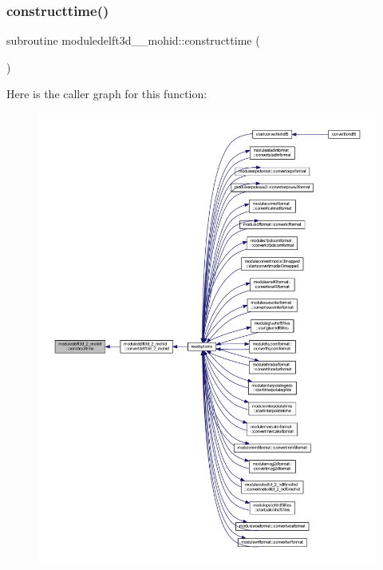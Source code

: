 \subsubsection{\texorpdfstring{constructtime()}{constructtime()}}
{\footnotesize\ttfamily subroutine moduledelft3d\+\_\+\_\+mohid\+::constructtime (\begin{DoxyParamCaption}{ }\end{DoxyParamCaption})\hspace{0.3cm}{\ttfamily [private]}}

Here is the caller graph for this function\+:\nopagebreak
\begin{figure}[H]
\begin{center}
\leavevmode
\includegraphics[width=350pt]{namespacemoduledelft3d__2__mohid_a6272b392fbc31727600ca81ee8fe5d43_icgraph}
\end{center}
\end{figure}
\mbox{\label{namespacemoduledelft3d__2__mohid_a03b75d6d9aec2bf65fd05cc9aaec61ab}} 
